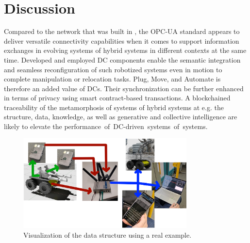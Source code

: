 \documentclass[conference]{IEEEtran}
\begin{document}
\section{Discussion}
Compared to the network that was built in \cite{SotaCAN}, the OPC-UA standard appears to deliver versatile connectivity capabilities when it comes to support information exchanges in evolving systems of hybrid systems in different contexts at the same time. Developed and employed DC components enable the  semantic integration and  seamless reconfiguration of such robotized systems even in motion to complete manipulation or relocation tasks. Plug, Move, and Automate is therefore an added value of DCs. Their synchronization can be further enhanced in terms of privacy using smart contract-based transactions. A blockchained traceability of the metamorphosis of systems of hybrid systems at e.g. the structure, data, knowledge, as well as generative and collective intelligence are likely to elevate the \mbox{performance of DC-driven systems of systems.}

\begin{figure}[b]
	\centerline{\includegraphics[width=8.9cm]{Pictures/AufbauBilder.png}}
	\caption{Visualization of the data structure using a real example.}
	\label{fig:AufbauBilder}
\end{figure}

\end{document}
